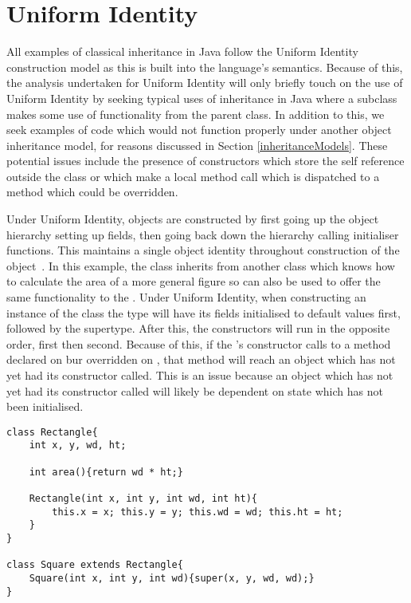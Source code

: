 \section{Uniform Identity}
\label{sec:uniformIdentity}
All examples of classical inheritance in Java follow the Uniform Identity construction model as this is built into the language's semantics. Because of this, the analysis undertaken for Uniform Identity will only briefly touch on the use of Uniform Identity by seeking typical uses of inheritance in Java where a subclass makes some use of functionality from the parent class. In addition to this, we seek examples of code which would not function properly under another object inheritance model, for reasons discussed in Section \ref{inheritanceModels}. These potential issues include the presence of constructors which store the self reference outside the class or which make a local method call which is dispatched to a method which could be overridden.
\newline

Under Uniform Identity, objects are constructed by first going up the object hierarchy setting up fields, then going back down the hierarchy calling initialiser functions. This maintains a single object identity throughout construction of the object~\cite{InheritanceWithoutClasses}. In this example, the  class inherits from another class which knows how to calculate the area of a more general figure so can also be used to offer the same functionality to the . Under Uniform Identity, when constructing an instance of the  class the  type will have its fields initialised to default values first, followed by the  supertype. After this, the constructors will run in the opposite order,  first then  second. Because of this, if the 's constructor calls to a method declared on  bur overridden on , that method will reach an object which has not yet had its constructor called. This is an issue because an object which has not yet had its constructor called will likely be dependent on state which has not been initialised.
\begin{lstlisting}
class Rectangle{
	int x, y, wd, ht;

	int area(){return wd * ht;}

	Rectangle(int x, int y, int wd, int ht){
		this.x = x; this.y = y; this.wd = wd; this.ht = ht;
	}
}

class Square extends Rectangle{
	Square(int x, int y, int wd){super(x, y, wd, wd);}
}
\end{lstlisting}

